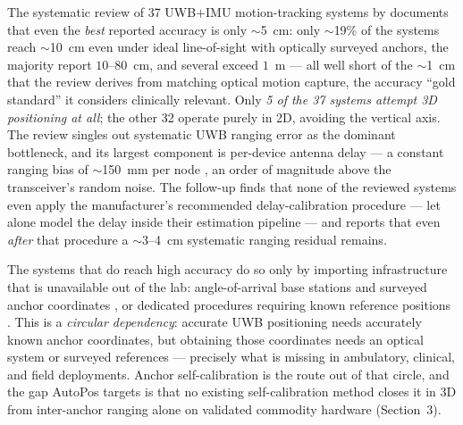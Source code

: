 \documentclass[11pt,a4paper]{article}
\begin{document}
The systematic review of 37 UWB$+$IMU motion-tracking systems by \citet{yogesh_2023} documents that
even the \emph{best} reported accuracy is only $\sim$5~cm: only $\sim$19\% of the systems reach
$\sim$10~cm even under ideal line-of-sight with optically surveyed anchors, the majority report
$10$--$80$~cm, and several exceed $1$~m --- all well short of the $\sim$1~cm that the review derives
from matching optical motion capture, the accuracy ``gold standard'' it considers clinically relevant. Only \emph{5 of the 37 systems attempt 3D positioning at all}; the other 32
operate purely in 2D, avoiding the vertical axis. The review singles out systematic UWB ranging error
as the dominant bottleneck, and its largest component is per-device antenna delay --- a constant
ranging bias of $\sim$150~mm per node \citep{shah_2021,sang_2019}, an order of magnitude above the
transceiver's random noise. The follow-up \citep{yogesh_2024} finds that none of the reviewed
systems even apply the manufacturer's recommended delay-calibration procedure --- let alone model
the delay inside their estimation pipeline --- and reports that even \emph{after} that procedure a
$\sim$3--4~cm systematic ranging residual remains.

The systems that do reach high accuracy do so only by importing infrastructure that is unavailable
out of the lab: angle-of-arrival base stations and surveyed anchor coordinates
\citep{zihajehzadeh_2017}, or dedicated
procedures requiring known reference positions \citep{kok_2015}. This is a \emph{circular
dependency}: accurate UWB positioning needs accurately known anchor coordinates, but obtaining those
coordinates needs an optical system or surveyed references --- precisely what is missing in
ambulatory, clinical, and field deployments. Anchor self-calibration is the route out of that
circle, and the gap AutoPos targets is that no existing self-calibration method closes it in 3D from
inter-anchor ranging alone on validated commodity hardware (Section~3).
\end{document}
